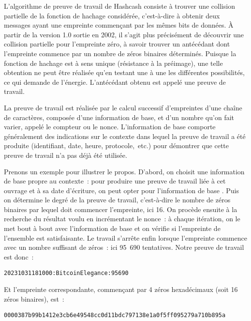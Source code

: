 
L'algorithme de preuve de travail de Hashcash consiste à trouver une collision partielle de la fonction de hachage considérée, c'est-à-dire à obtenir deux messages ayant une empreinte commençant par les mêmes bits de données. À partir de la version 1.0 sortie en 2002, il s'agit plus précisément de découvrir une collision partielle pour l'empreinte zéro, à savoir trouver un antécédant dont l'empreinte commence par un nombre de zéros binaires déterminés. Puisque la fonction de hachage est à sens unique (résistance à la préimage), une telle obtention ne peut être réalisée qu'en testant une à une les différentes possibilités, ce qui demande de l'énergie. L'antécédant obtenu est appelé une preuve de travail.

La preuve de travail est réalisée par le calcul successif d'empreintes d'une chaîne de caractères, composée d'une information de base, et d'un nombre qu'on fait varier, appelé le compteur ou le nonce. L'information de base comporte généralement des indications sur le contexte dans lequel la preuve de travail a été produite (identifiant, date, heure, protocole,~etc.) pour démontrer que cette preuve de travail n'a pas déjà été utilisée.

Prenons un exemple pour illustrer le propos. D'abord, on choisit une information de base propre au contexte~: pour produire une preuve de travail liée à cet ouvrage et à sa date d'écriture, on peut opter pour l'information de base . Puis on détermine le degré de la preuve de travail, c'est-à-dire le nombre de zéros binaires par lequel doit commencer l'empreinte, ici 16. On procède ensuite à la recherche du résultat voulu en incrémentant le nonce~: à chaque itération, on le met bout à bout avec l'information de base et on vérifie si l'empreinte de l'ensemble est satisfaisante. Le travail s'arrête enfin lorsque l'empreinte commence avec un nombre suffisant de zéros~: ici 95~690 tentatives. Notre preuve de travail est donc~:

\begin{Verbatim}[fontsize=\footnotesize]
20231031181000:BitcoinElegance:95690
\end{Verbatim}

Et l'empreinte correspondante, commençant par 4 zéros hexadécimaux (soit 16 zéros binaires), est~:

\begin{Verbatim}[fontsize=\footnotesize]
0000387b99b1412e3cb6e49548cc0d11bdc797138e1a0f5ff095279a710b895a
\end{Verbatim}

